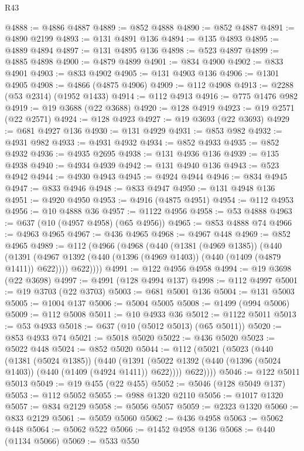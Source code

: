 \begin{lexlean}{R43}
\begin{coremodule}
@4888 := @4886 @4887
@4889 := @852 @4888
@4890 := @852 @4887
@4891 := @4890 @2199
@4893 := @131 @4891 @136
@4894 := @135 @4893
@4895 := @4889 @4894
@4897 := @131 @4895 @136
@4898 := @523 @4897
@4899 := @4885 @4898
@4900 := @4879 @4899
@4901 := @834 @4900
@4902 := @833 @4901
@4903 := @833 @4902
@4905 := @131 @4903 @136
@4906 := @1301 @4905
@4908 := @4866 (@4875 @4906)
@4909 := @112 @4908
@4913 := @2288 (@53 @2314) (@1952 @1433)
@4914 := @112 @4913
@4916 := @775 @1476 @982
@4919 := @19 @3688 (@22 @3688)
@4920 := @128 @4919
@4923 := @19 @2571 (@22 @2571)
@4924 := @128 @4923
@4927 := @19 @3693 (@22 @3693)
@4929 := @681 @4927 @136
@4930 := @131 @4929
@4931 := @853 @982
@4932 := @4931 @982
@4933 := @4931 @4932
@4934 := @852 @4933
@4935 := @852 @4932
@4936 := @4935 @2695
@4938 := @131 @4936 @136
@4939 := @135 @4938
@4940 := @4934 @4939
@4942 := @131 @4940 @136
@4943 := @523 @4942
@4944 := @4930 @4943
@4945 := @4924 @4944
@4946 := @834 @4945
@4947 := @833 @4946
@4948 := @833 @4947
@4950 := @131 @4948 @136
@4951 := @4920 @4950
@4953 := @4916 (@4875 @4951)
@4954 := @112 @4953
@4956 := @10 @4888 @36
@4957 := @1122 @4956
@4958 := @53 @4888
@4963 := @637 (@10 (@4957 @4958) (@65 @4956))
@4965 := @853 @4888 @74
@4966 := @4963 @4965
@4967 := @436 @4965
@4968 := @4967 @448
@4969 := @852 @4965
@4989 := @112
    (@4966
      (@4968
        (@440
          (@1381 (@4969 @1385))
          (@440
            (@1391 (@4967 @1392 (@440 (@1396 (@4969 @1403)) (@440 (@1409 (@4879 @1411)) @622))))
            @622))))
@4991 := @122 @4956 @4958
@4994 := @19 @3698 (@22 @3698)
@4997 := @4991 (@128 @4994 @137)
@4998 := @112 @4997
@5001 := @19 @3703 (@22 @3703)
@5003 := @681 @5001 @136
@5004 := @131 @5003
@5005 := @1004 @137
@5006 := @5004 @5005
@5008 := @1499 (@994 @5006)
@5009 := @112 @5008
@5011 := @10 @4933 @36
@5012 := @1122 @5011
@5013 := @53 @4933
@5018 := @637 (@10 (@5012 @5013) (@65 @5011))
@5020 := @853 @4933 @74
@5021 := @5018 @5020
@5022 := @436 @5020
@5023 := @5022 @448
@5024 := @852 @5020
@5044 := @112
    (@5021
      (@5023
        (@440
          (@1381 (@5024 @1385))
          (@440
            (@1391 (@5022 @1392 (@440 (@1396 (@5024 @1403)) (@440 (@1409 (@4924 @1411)) @622))))
            @622))))
@5046 := @122 @5011 @5013
@5049 := @19 @455 (@22 @455)
@5052 := @5046 (@128 @5049 @137)
@5053 := @112 @5052
@5055 := @988 @1320 @2110
@5056 := @1017 @1320
@5057 := @834 @2129
@5058 := @5056 @5057
@5059 := @2323 @1320
@5060 := @833 @2129
@5061 := @5059 @5060
@5062 := @436 @4958
@5063 := @5062 @448
@5064 := @5062 @522
@5066 := @1452 @4958 @136
@5068 := @440 (@1134 @5066)
@5069 := @533 @550

\end{coremodule}
\end{lexlean}
